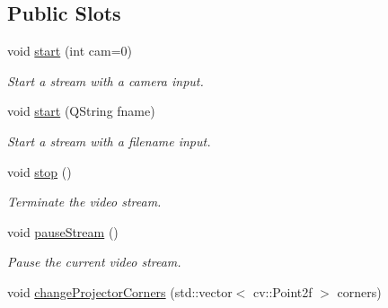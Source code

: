 \subsection*{Public Slots}
\begin{DoxyCompactItemize}
\item 
void \hyperlink{classTrackingStream_ab89c8ac2ef5ee1c6c8f31a99a95a8cfc}{start} (int cam=0)\hypertarget{classTrackingStream_ab89c8ac2ef5ee1c6c8f31a99a95a8cfc}{}\label{classTrackingStream_ab89c8ac2ef5ee1c6c8f31a99a95a8cfc}

\begin{DoxyCompactList}\small\item\em Start a stream with a camera input. \end{DoxyCompactList}\item 
void \hyperlink{classTrackingStream_a24e9c3468c90c9ccd14f217edaf8bd38}{start} (Q\+String fname)\hypertarget{classTrackingStream_a24e9c3468c90c9ccd14f217edaf8bd38}{}\label{classTrackingStream_a24e9c3468c90c9ccd14f217edaf8bd38}

\begin{DoxyCompactList}\small\item\em Start a stream with a filename input. \end{DoxyCompactList}\item 
void \hyperlink{classTrackingStream_ad7d1aeaede96e94984f4a2e9b205076a}{stop} ()\hypertarget{classTrackingStream_ad7d1aeaede96e94984f4a2e9b205076a}{}\label{classTrackingStream_ad7d1aeaede96e94984f4a2e9b205076a}

\begin{DoxyCompactList}\small\item\em Terminate the video stream. \end{DoxyCompactList}\item 
void \hyperlink{classTrackingStream_a5a086300d68ae7e13fe17ba9ef49c52a}{pause\+Stream} ()\hypertarget{classTrackingStream_a5a086300d68ae7e13fe17ba9ef49c52a}{}\label{classTrackingStream_a5a086300d68ae7e13fe17ba9ef49c52a}

\begin{DoxyCompactList}\small\item\em Pause the current video stream. \end{DoxyCompactList}\item 
void \hyperlink{classTrackingStream_a198d532c89d9d740852fb3a083347ca8}{change\+Projector\+Corners} (std\+::vector$<$ cv\+::\+Point2f $>$ corners)\hypertarget{classTrackingStream_a198d532c89d9d740852fb3a083347ca8}{}\label{classTrackingStream_a198d532c89d9d740852fb3a083347ca8}


\end{DoxyCompactItemize}
